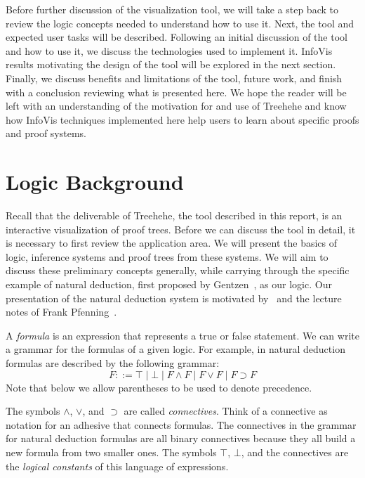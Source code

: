 \documentclass[conference]{IEEEtran}
\newcommand{\projectname}{Treehehe}
\begin{document}
Before further discussion of the visualization tool, we will take a step back to review the logic concepts needed to understand how to use it. Next, the tool and expected user tasks will be described. Following an initial discussion of the tool and how to use it, we discuss the technologies used to implement it. InfoVis results motivating the design of the tool will be explored in the next section. Finally, we discuss benefits and limitations of the tool, future work, and finish with a conclusion reviewing what is presented here. We hope the reader will be left with an understanding of the motivation for and use of \projectname{} and know how InfoVis techniques implemented here help users to learn about specific proofs and proof systems.

\section{Logic Background}
\label{sec:background}

Recall that the deliverable of \projectname{}, the tool described in this report, is an interactive visualization of proof trees. Before we can discuss the tool in detail, it is necessary to first review the application area. We will present the basics of logic, inference systems and proof trees from these systems. We will aim to discuss these preliminary concepts generally, while carrying through the specific example of natural deduction, first proposed by Gentzen~\cite{natded-gentzen}, as our logic. Our presentation of the natural deduction system is motivated by~\cite[1.2 Natural Deduction]{logicincs-huth+ryan} and the lecture notes of Frank Pfenning~\cite{natded-pfenning}.

A \textit{formula} is an expression that represents a true or false statement. We can write a grammar for the formulas of a given logic. For example, in natural deduction formulas are described by the following grammar:
$$
F ::= \top \; | \; \bot \; | \; F \wedge F \; | \; F \vee F \; | \; F \supset F
$$
Note that below we allow parentheses to be used to denote precedence.

The symbols $\wedge$, $\vee$, and $\supset$ are called \textit{connectives}. Think of a connective as notation for an adhesive that connects formulas. The connectives in the grammar for natural deduction formulas are all binary connectives because they all build a new formula from two smaller ones. The symbols $\top$, $\bot$, and the connectives are the \textit{logical constants} of this language of expressions.
\end{document}
